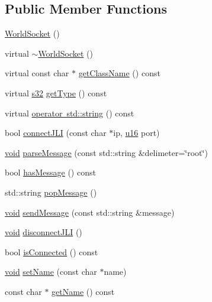 \subsection*{Public Member Functions}
\begin{DoxyCompactItemize}
\item 
\mbox{\hyperlink{classnjli_1_1_world_socket_a48206691f6d67e6d2cadd5871236e688}{World\+Socket}} ()
\item 
virtual \mbox{\hyperlink{classnjli_1_1_world_socket_a11a9b35e1abfa429eaf2797ebcc5e06e}{$\sim$\+World\+Socket}} ()
\item 
virtual const char $\ast$ \mbox{\hyperlink{classnjli_1_1_world_socket_a5a98ed3511ee0c2784ad14e36a6a6fd0}{get\+Class\+Name}} () const
\item 
virtual \mbox{\hyperlink{_util_8h_aa62c75d314a0d1f37f79c4b73b2292e2}{s32}} \mbox{\hyperlink{classnjli_1_1_world_socket_a497c7bba3a7001fb1ad2f8c98768d9eb}{get\+Type}} () const
\item 
virtual \mbox{\hyperlink{classnjli_1_1_world_socket_a6a0a48963031efd27782ea8c6d256663}{operator std\+::string}} () const
\item 
bool \mbox{\hyperlink{classnjli_1_1_world_socket_a9fa97067d750876046d8a0b79eaa2708}{connect\+J\+LI}} (const char $\ast$ip, \mbox{\hyperlink{_util_8h_a9e6c91d77e24643b888dbd1a1a590054}{u16}} port)
\item 
\mbox{\hyperlink{_thread_8h_af1e856da2e658414cb2456cb6f7ebc66}{void}} \mbox{\hyperlink{classnjli_1_1_world_socket_a72f3fbc4ed89cd5fc2c98e02e85577a0}{parse\+Message}} (const std\+::string \&delimeter=\char`\"{}root\char`\"{})
\item 
bool \mbox{\hyperlink{classnjli_1_1_world_socket_ae4161c8d9db7f9b53dd855c0313b5d18}{has\+Message}} () const
\item 
std\+::string \mbox{\hyperlink{classnjli_1_1_world_socket_ab748f606af5d49786785a5d9f3b9fa97}{pop\+Message}} ()
\item 
\mbox{\hyperlink{_thread_8h_af1e856da2e658414cb2456cb6f7ebc66}{void}} \mbox{\hyperlink{classnjli_1_1_world_socket_aeb35c51f861acc84da71dd68a09fd2c2}{send\+Message}} (const std\+::string \&message)
\item 
\mbox{\hyperlink{_thread_8h_af1e856da2e658414cb2456cb6f7ebc66}{void}} \mbox{\hyperlink{classnjli_1_1_world_socket_af3e1664b23b7ded9a695c51140a8c209}{disconnect\+J\+LI}} ()
\item 
bool \mbox{\hyperlink{classnjli_1_1_world_socket_ae3c8b6487d5edb322a93bf9204c287a2}{is\+Connected}} () const
\item 
\mbox{\hyperlink{_thread_8h_af1e856da2e658414cb2456cb6f7ebc66}{void}} \mbox{\hyperlink{classnjli_1_1_world_socket_a087eb5f8d9f51cc476f12f1d10a3cb95}{set\+Name}} (const char $\ast$name)
\item 
const char $\ast$ \mbox{\hyperlink{classnjli_1_1_world_socket_ad41266885be835f3ee602311e20877a4}{get\+Name}} () const
\end{DoxyCompactItemize}
